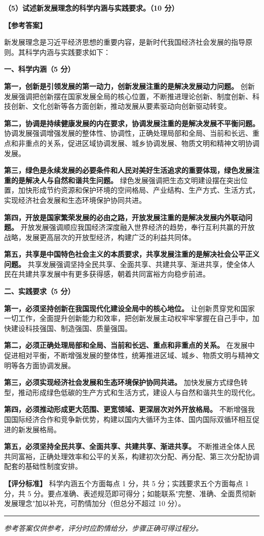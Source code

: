 \documentclass[12pt, a4paper]{article}
\newcommand{\examrule}{\noindent\rule{\linewidth}{0.6pt}}
\begin{document}
\begin{answerbox}
\textbf{（5）试述新发展理念的科学内涵与实践要求。（10 分）}

\textbf{【参考答案】}

新发展理念是习近平经济思想的重要内容，是新时代我国经济社会发展的指导原则。其科学内涵与实践要求如下：

\textbf{一、科学内涵（5 分）}

\textbf{第一，创新是引领发展的第一动力，创新发展注重的是解决发展动力问题。} 创新发展强调把创新摆在国家发展全局的核心位置，不断推进理论创新、制度创新、科技创新、文化创新等各方面创新，推动发展从要素驱动向创新驱动转变。

\textbf{第二，协调是持续健康发展的内在要求，协调发展注重的是解决发展不平衡问题。} 协调发展强调增强发展的整体性、协调性，正确处理局部和全局、当前和长远、重点和非重点的关系，促进区域协调发展、城乡协调发展、物质文明和精神文明协调发展。

\textbf{第三，绿色是永续发展的必要条件和人民对美好生活追求的重要体现，绿色发展注重的是解决人与自然和谐共生问题。} 绿色发展强调把生态文明建设摆在突出位置，加快形成节约资源和保护环境的空间格局、产业结构、生产方式、生活方式，实现经济社会发展和生态环境保护协同共进。

\textbf{第四，开放是国家繁荣发展的必由之路，开放发展注重的是解决发展内外联动问题。} 开放发展强调顺应我国经济深度融入世界经济的趋势，奉行互利共赢的开放战略，发展更高层次的开放型经济，构建广泛的利益共同体。

\textbf{第五，共享是中国特色社会主义的本质要求，共享发展注重的是解决社会公平正义问题。} 共享发展强调坚持全民共享、全面共享、共建共享、渐进共享，使全体人民在共建共享发展中有更多获得感，朝着共同富裕方向稳步前进。

\textbf{二、实践要求（5 分）}

\textbf{第一，必须坚持创新在我国现代化建设全局中的核心地位。} 让创新贯穿党和国家一切工作，全面提升创新能力和效率，把创新发展主动权牢牢掌握在自己手中，加快建设科技强国、制造强国、质量强国。

\textbf{第二，必须正确处理局部和全局、当前和长远、重点和非重点的关系。} 在发展中促进相对平衡，不断增强发展的整体性，统筹推进区域、城乡、物质文明与精神文明等各方面协调发展。

\textbf{第三，必须实现经济社会发展和生态环境保护协同共进。} 加快发展方式绿色转型，推动形成绿色低碳的生产方式和生活方式，建设人与自然和谐共生的现代化。

\textbf{第四，必须推动形成更大范围、更宽领域、更深层次对外开放格局。} 不断增强我国国际经济合作和竞争新优势，构建以国内大循环为主体、国内国际双循环相互促进的新发展格局。

\textbf{第五，必须坚持全民共享、全面共享、共建共享、渐进共享。} 不断推进全体人民共同富裕，正确处理效率和公平的关系，构建初次分配、再分配、第三次分配协调配套的基础性制度安排。

\textbf{【评分标准】} 科学内涵五个方面每点 1 分，共 5 分；实践要求五个方面每点 1 分，共 5 分。要点准确、表述规范即可得分；如能联系"完整、准确、全面贯彻新发展理念"加以补充，可酌情加分（但总分不超过 10 分）。
\end{answerbox}

\vspace{12pt}
\examrule
\begin{center}
  \textit{参考答案仅供参考，评分时应酌情给分，步骤正确可得过程分。}
\end{center}
\end{document}
